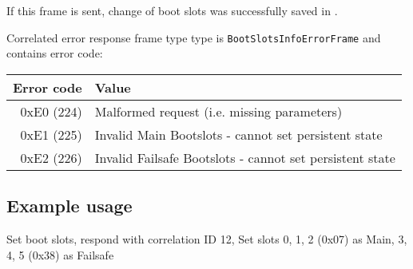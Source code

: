 If this frame is sent, change of boot slots was successfully saved in .


Correlated error response frame type type is \texttt{BootSlotsInfoErrorFrame} and contains error code:

\begin{tabular}{r | l}
    Error code & Value \\
    \hline
    0xE0 (224) & Malformed request (i.e. missing parameters) \\
    0xE1 (225) & Invalid Main Bootslots - cannot set persistent state \\
    0xE2 (226) & Invalid Failsafe Bootslots - cannot set persistent state \\
\end{tabular}

\subsection{Example usage}
Set boot slots, respond with correlation ID 12, Set slots 0, 1, 2 (0x07) as Main, 3, 4, 5 (0x38) as Failsafe

